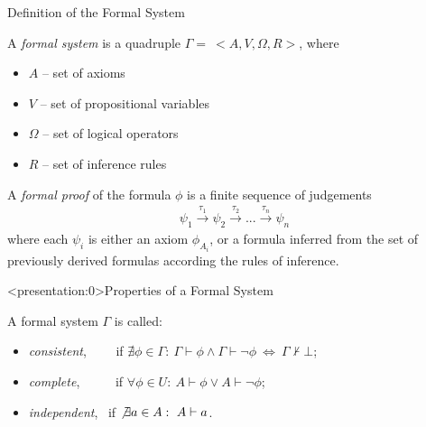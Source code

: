 \documentclass[aspectratio=169, fleqn]{beamer}
\begin{document}
\begin{frame}{Definition of the Formal System}%

A \textit{formal system} is a quadruple $\Gamma = \ <A, V, \Omega, R>$, where
\begin{itemize}
  \item $A$ -- set of axioms
  \item $V$ -- set of propositional variables
  \item $\Omega$ -- set of logical operators
  \item $R$ -- set of inference rules
\end{itemize} 

\vspace{15pt}

A \textit{formal proof} of the formula $\phi$ is a finite sequence of judgements 
\begin{align*}
\psi_1 \xrightarrow{\tau_1} \psi_2 \xrightarrow{\tau_2} ... \xrightarrow{\tau_n} \psi_n 
\end{align*}
where each $\psi_i$ is either an axiom $\phi_{A_i}$, or a formula inferred from the set of previously derived formulas according the rules of inference.

\end{frame}


\begin{frame}<presentation:0>{Properties of a Formal System}

A formal system $\Gamma$ is called:

\begin{itemize}
\item  \textit{consistent}, \ \ \ \ if $\nexists \phi \in \Gamma: \ \Gamma \vdash \phi \land  \Gamma \vdash \neg \phi  \ \Leftrightarrow \ \Gamma \nvdash \bot$; 
\\ \vspace{3pt}
\item \textit{complete}, \ \ \ \ \ if $\forall \phi \in U: \ A \vdash \phi \lor A \vdash \neg \phi$;
\\ \vspace{3pt}
\item \textit{independent}, \ if $\not \exists a \in A: \ A \vdash a$.
\end{itemize}

\end{frame}
\end{document}
